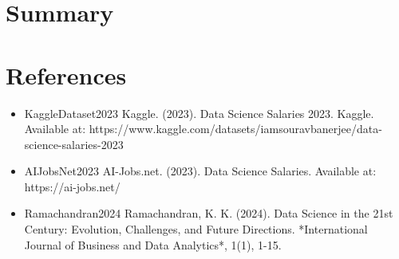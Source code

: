 \documentclass{article}\usepackage[]{graphicx}\usepackage[]{xcolor}
\begin{document}
\newpage
\section{Summary}

\newpage
\section{References}
\begin{itemize}

\item {KaggleDataset2023}
Kaggle. (2023). Data Science Salaries 2023. Kaggle. Available at: https://www.kaggle.com/datasets/iamsouravbanerjee/data-science-salaries-2023 

\item {AIJobsNet2023}
AI-Jobs.net. (2023). Data Science Salaries. Available at: https://ai-jobs.net/ 

\item {Ramachandran2024}
Ramachandran, K. K. (2024). Data Science in the 21st Century: Evolution, Challenges, and Future Directions. *International Journal of Business and Data Analytics*, 1(1), 1-15. 
\end{itemize}
\end{document}
